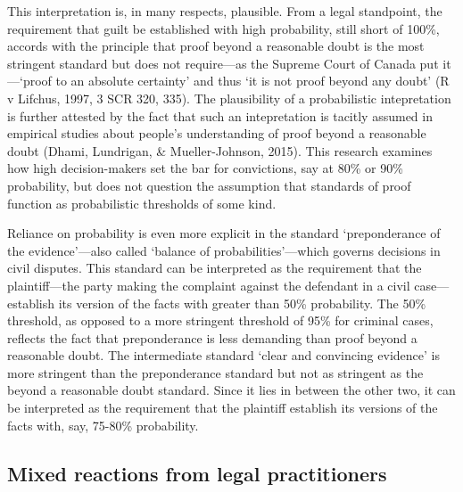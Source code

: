 \documentclass[10pt,dvipsnames,enabledeprecatedfontcommands]{scrartcl}
\begin{document}
This interpretation is, in many respects, plausible. From a legal
standpoint, the requirement that guilt be established with high
probability, still short of 100\%, accords with the principle that proof
beyond a reasonable doubt is the most stringent standard but does not
require---as the Supreme Court of Canada put it---`proof to an absolute
certainty' and thus `it is not proof beyond any doubt' (R v Lifchus,
1997, 3 SCR 320, 335). The plausibility of a probabilistic intepretation
is further attested by the fact that such an intepretation is tacitly
assumed in empirical studies about people's understanding of proof
beyond a reasonable doubt (Dhami, Lundrigan, \& Mueller-Johnson, 2015).
This research examines how high decision-makers set the bar for
convictions, say at 80\% or 90\% probability, but does not question the
assumption that standards of proof function as probabilistic thresholds
of some kind.

Reliance on probability is even more explicit in the standard
`preponderance of the evidence'---also called `balance of
probabilities'---which governs decisions in civil disputes. This
standard can be interpreted as the requirement that the plaintiff---the
party making the complaint against the defendant in a civil
case---establish its version of the facts with greater than 50\%
probability. The 50\% threshold, as opposed to a more stringent
threshold of 95\% for criminal cases, reflects the fact that
preponderance is less demanding than proof beyond a reasonable doubt.
The intermediate standard `clear and convincing evidence' is more
stringent than the preponderance standard but not as stringent as the
beyond a reasonable doubt standard. Since it lies in between the other
two, it can be interpreted as the requirement that the plaintiff
establish its versions of the facts with, say, 75-80\% probability.

\subsection{Mixed reactions from legal
practitioners}\label{mixed-reactions-from-legal-practitioners}
\end{document}
